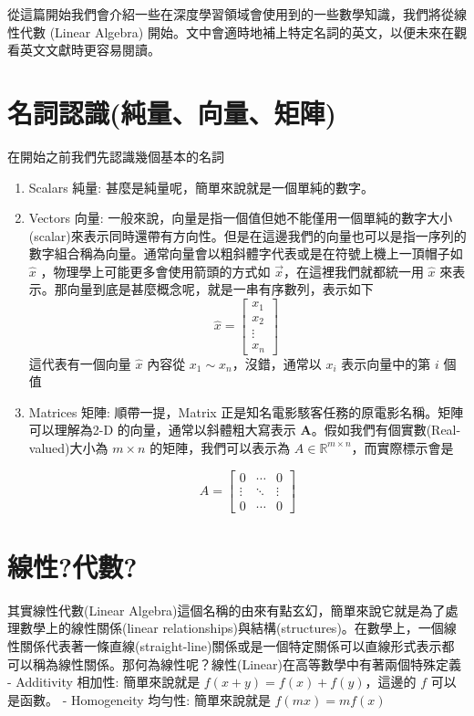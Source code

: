 \documentclass[11pt]{article}
\begin{document}
從這篇開始我們會介紹一些在深度學習領域會使用到的一些數學知識，我們將從線性代數 (Linear Algebra) 開始。文中會適時地補上特定名詞的英文，以便未來在觀看英文文獻時更容易閱讀。
\section{名詞認識(純量、向量、矩陣)}
在開始之前我們先認識幾個基本的名詞
\begin{enumerate}
    \item Scalars 純量: 
        甚麼是純量呢，簡單來說就是一個單純的數字。
    \item Vectors 向量: 一般來說，向量是指一個值但她不能僅用一個單純的數字大小(scalar)來表示同時還帶有方向性。但是在這邊我們的向量也可以是指一序列的數字組合稱為向量。通常向量會以粗斜體字代表或是在符號上機上一頂帽子如 $\hat{x}$ ，物理學上可能更多會使用箭頭的方式如 $\vec{x}$，在這裡我們就都統一用 $\hat{x}$ 來表示。那向量到底是甚麼概念呢，就是一串有序數列，表示如下  
    \[
        \hat{x} = \begin{bmatrix} x_1 \\ x_2 \\ \vdots \\ x_n \end{bmatrix} \
    \]
    這代表有一個向量 $\hat{x}$ 內容從 $x_1 \sim x_n$，沒錯，通常以 $x_i$ 表示向量中的第 $i$ 個值
    \item Matrices 矩陣: 順帶一提，Matrix 正是知名電影駭客任務的原電影名稱。矩陣可以理解為2-D 的向量，通常以斜體粗大寫表示 $\boldsymbol{A}$。假如我們有個實數(Real-valued)大小為 $m \times n$ 的矩陣，我們可以表示為 $A \in \mathbb{R}^{m \times n}$，而實際標示會是
    
    $$
    A =   \begin{bmatrix}
    0      & \cdots & 0      \\
    \vdots & \ddots & \vdots \\
    0      & \cdots & 0
    \end{bmatrix}
    $$
\end{enumerate}

\section{線性?代數?}
其實線性代數(Linear Algebra)這個名稱的由來有點玄幻，簡單來說它就是為了處理數學上的線性關係(linear relationships)與結構(structures)。在數學上，一個線性關係代表著一條直線(straight-line)關係或是一個特定關係可以直線形式表示都可以稱為線性關係。那何為線性呢？線性(Linear)在高等數學中有著兩個特殊定義
- Additivity 相加性: 簡單來說就是 $f(x+y) = f(x) + f(y)$，這邊的 $f$ 可以是函數。
- Homogeneity 均勻性: 簡單來說就是 $f(mx) = mf(x)$  
\end{document}
